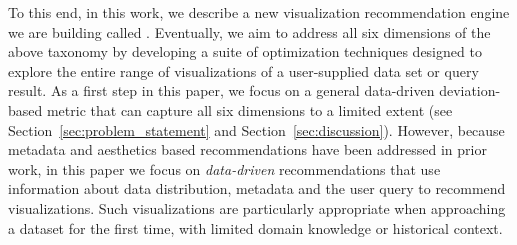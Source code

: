 To this end, in this work, we describe a new visualization recommendation engine we are building called {\it \SeeDB}.
Eventually, we aim to address all six dimensions of the above taxonomy by developing a suite of optimization techniques designed to explore
the entire range of visualizations of a user-supplied data set or query result.  
As a first step in this paper, we focus on a general data-driven deviation-based metric that can capture all six dimensions to a limited extent (see Section~\ref{sec:problem_statement} and Section~\ref{sec:discussion}).  However, because metadata and aesthetics based recommendations have been addressed in prior work, in this paper we focus on {\it data-driven} recommendations that use information about data distribution, metadata and the user query to recommend visualizations.
Such visualizations are particularly appropriate when
approaching a dataset for the first time, with limited domain knowledge or historical context.


